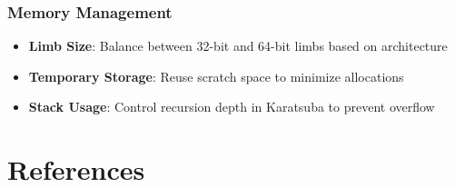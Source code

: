\documentclass[12pt,a4paper]{article}
\theoremstyle{definition}
\begin{document}
\subsubsection{Memory Management}
\begin{itemize}
    \item \textbf{Limb Size}: Balance between 32-bit and 64-bit limbs based on architecture
    \item \textbf{Temporary Storage}: Reuse scratch space to minimize allocations
    \item \textbf{Stack Usage}: Control recursion depth in Karatsuba to prevent overflow
\end{itemize}

\section{References}
\end{document}
